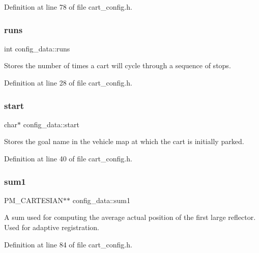 Definition at line 78 of file cart\+\_\+config.\+h.

\mbox{\label{structconfig__data_adc9d0db49d5276dd09e63901adf2d3df}} 
\subsubsection{\texorpdfstring{runs}{runs}}
{\footnotesize\ttfamily int config\+\_\+data\+::runs}

Stores the number of times a cart will cycle through a sequence of stops. 

Definition at line 28 of file cart\+\_\+config.\+h.

\mbox{\label{structconfig__data_a9553e6685a392714b4d08b4081145565}} 
\subsubsection{\texorpdfstring{start}{start}}
{\footnotesize\ttfamily char$\ast$ config\+\_\+data\+::start}

Stores the goal name in the vehicle map at which the cart is initially parked. 

Definition at line 40 of file cart\+\_\+config.\+h.

\mbox{\label{structconfig__data_a16e482f7e73e9fe797fbf4b380894aac}} 
\subsubsection{\texorpdfstring{sum1}{sum1}}
{\footnotesize\ttfamily P\+M\+\_\+\+C\+A\+R\+T\+E\+S\+I\+AN$\ast$$\ast$ config\+\_\+data\+::sum1}

A sum used for computing the average actual position of the first large reflector. Used for adaptive registration. 

Definition at line 84 of file cart\+\_\+config.\+h.

\mbox{\label{structconfig__data_a7b4b5f88455123fafa44f8d48b2ebf3d}} 
